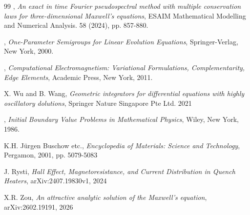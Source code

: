 \documentclass[10pt,reqno]{amsart}
\renewcommand{\(}{\left(}
\renewcommand{\)}{\right)}
\numberwithin{equation}{section}
\begin{document}
\begin{thebibliography}{99}
, \emph{An exact in time Fourier pseudospectral method with multiple conservation laws for three-dimensional Maxwell's equations}, ESAIM Mathematical Modelling and Numerical Analysis. 58 (2024), pp. 857-880.


, \emph{One-Parameter Semigroups for Linear Evolution Equations}, Springer-Verlag, New York, 2000.

, \emph{Computational Electromagnetism: Variational Formulations, Complementarity, Edge Elements},  Academic Press, New York, 2011.

 {\sc  X. Wu and B. Wang}, \emph{Geometric integrators for differential equations with highly oscillatory dolutions}, Springer Nature Singapore Pte Ltd. 2021

, \emph{Initial Boundary Value Problems in Mathematical Physics}, Wiley, New York, 1986.



{\sc K.H. J\"urgen Buschow etc.}, \emph{Encyclopedia of Materials: Science and Technology}, Pergamon, 2001, pp. 5079-5083

{\sc J. Rysti}, \emph{Hall Effect, Magnetoresistance, and Current Distribution in Quench Heaters}, arXiv:2407.19830v1, 2024

{\sc X.R. Zou}, \emph{An attractive analytic solution of the Maxwell's equation}, arXiv:2602.19191, 2026

\end{thebibliography}
\end{document}
